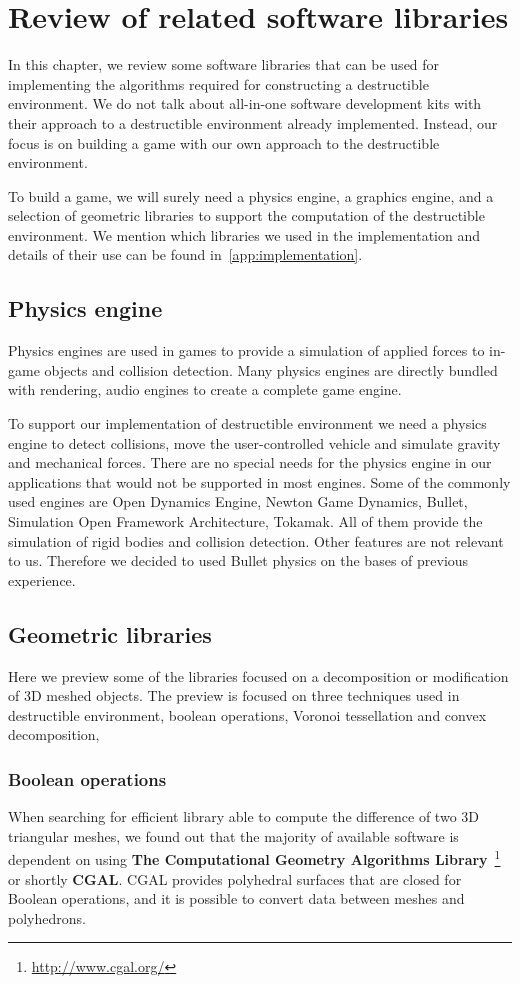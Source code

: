 \chapter{Review of related software libraries}
\label{chapt:technology}
In this chapter, we review some software libraries that can be used for implementing the algorithms required for constructing a destructible environment. We do not talk about all-in-one software development kits with their approach to a destructible environment already implemented. Instead, our focus is on building a game with our own approach to the destructible environment. 

To build a game, we will surely need a physics engine, a graphics engine, and a selection of geometric libraries to support the computation of the destructible environment. We mention which libraries we used in the implementation and details of their use can be found in~\cref{app:implementation}.

\section{Physics engine}
Physics engines are used in games to provide a simulation of applied forces to in-game objects and collision detection. Many physics engines are directly bundled with rendering, audio engines to create a complete game engine. 

To support our implementation of destructible environment we need a physics engine to detect collisions, move the user-controlled vehicle and simulate gravity and mechanical forces. There are no special needs for the physics engine in our applications that would not be supported in most engines. Some of the commonly used engines are Open Dynamics Engine, Newton Game Dynamics, Bullet, Simulation Open Framework Architecture, Tokamak. All of them provide the simulation of rigid bodies and collision detection. Other features are not relevant to us. Therefore we decided to used Bullet physics on the bases of previous experience.

\section{Geometric libraries}
Here we preview some of the libraries focused on a decomposition or modification of 3D meshed objects. The preview is focused on three techniques used in destructible environment, boolean operations, Voronoi tessellation and convex decomposition,

\subsection{Boolean operations}
When searching for efficient library able to compute the difference of two 3D triangular meshes, we found out that the majority of available software
is dependent on using \textbf{The Computational Geometry Algorithms Library}~\footnote{\url{http://www.cgal.org/}} or shortly \textbf{CGAL}. CGAL provides polyhedral surfaces that are closed for Boolean operations, and it is possible to convert data between meshes and polyhedrons. 


